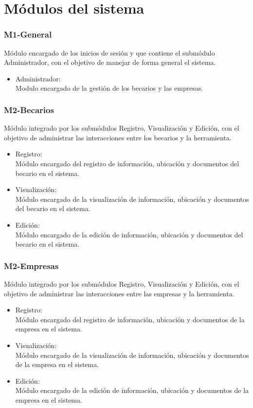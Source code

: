 \section{Módulos del sistema}



\subsubsection{M1-General}
Módulo encargado de los inicios de sesión y que contiene el submódulo Administrador, con el objetivo de manejar de forma general el sistema.
\begin{itemize}
    \item Administrador:\\
    Modulo encargado de la gestión de los becarios y las empresas.

\end{itemize}

\subsubsection{M2-Becarios}
Módulo integrado por los submódulos Registro, Visualización y Edición, con el objetivo de administrar las interacciones entre los becarios y la herramienta.
\begin{itemize}
    \item Registro:\\
    Módulo encargado del registro de información, ubicación y documentos del becario en el sistema.
    \item Visualización:\\
    Módulo encargado de la visualización de información, ubicación y documentos del becario en el sistema.
    \item Edición:\\
    Módulo encargado de la edición de información, ubicación y documentos del becario en el sistema.
\end{itemize}


\subsubsection{M2-Empresas}
Módulo integrado por los submódulos Registro, Visualización y Edición, con el objetivo de administrar las interacciones entre las empresas y la herramienta.

\begin{itemize}
    \item Registro:\\
    Módulo encargado del registro de información, ubicación y documentos de la empresa en el sistema.
    \item Visualización:\\
    Módulo encargado de la visualización de información, ubicación y documentos de la empresa en el sistema.
    \item Edición:\\
    Módulo encargado de la edición de información, ubicación y documentos de la empresa en el sistema. 
\end{itemize}


